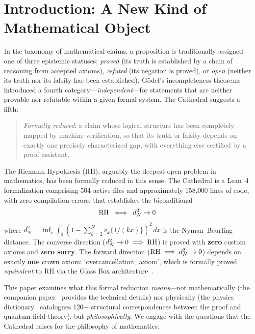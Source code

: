 \section{Introduction: A New Kind of Mathematical Object}
\label{sec:introduction}

In the taxonomy of mathematical claims, a proposition is traditionally
assigned one of three epistemic statuses: \emph{proved} (its truth is
established by a chain of reasoning from accepted axioms),
\emph{refuted} (its negation is proved), or \emph{open} (neither its
truth nor its falsity has been established). G\"odel's incompleteness
theorems~\cite{godel1931} introduced a fourth category---\emph{independent}---for
statements that are neither provable nor refutable within a given
formal system. The Cathedral suggests a fifth:

\begin{quote}
\emph{Formally reduced}: a claim whose logical structure has been
completely mapped by machine verification, so that its truth or
falsity depends on exactly one precisely characterized gap,
with everything else certified by a proof assistant.
\end{quote}

The Riemann Hypothesis (RH), arguably the deepest open problem in
mathematics, has been formally reduced in this sense. The Cathedral
is a Lean~4 formalization comprising 504 active files and
approximately 158{,}000 lines of code, with zero compilation errors,
that establishes the biconditional
\[
  \mathrm{RH} \;\iff\; d_N^2 \to 0
\]
where $d_N^2 = \inf_v \int_0^1 (1 - \sum_{k=2}^{N} v_k \{1/(kx)\})^2\,dx$
is the Nyman--Beurling distance. The converse direction
($d_N^2 \to 0 \implies \mathrm{RH}$) is proved with \textbf{zero} custom
axioms and \textbf{zero sorry}. The forward direction
($\mathrm{RH} \implies d_N^2 \to 0$) depends on exactly \textbf{one}
crown axiom: `overcancellation\_axiom', which is formally proved
\emph{equivalent} to RH via the Glass Box architecture~\cite{baezduarte2003}.

This paper examines what this formal reduction \emph{means}---not
mathematically (the companion paper~\cite{cathedral} provides the
technical details) nor physically (the physics dictionary~\cite{cathedral-physics}
catalogues 120+ structural correspondences between the proof and
quantum field theory), but \emph{philosophically}. We engage with
the questions that the Cathedral raises for the philosophy of
mathematics:

